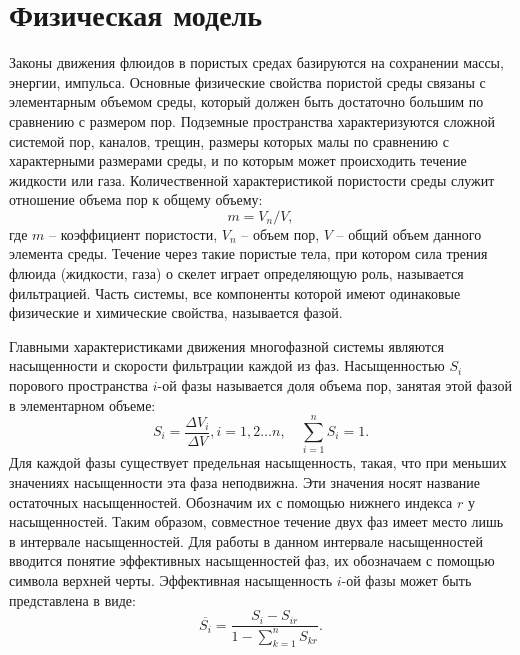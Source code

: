 \section{Физическая модель}

Законы движения флюидов в пористых средах базируются на сохранении
массы, энергии, импульса. Основные
физические свойства пористой среды связаны с элементарным
объемом среды, который должен быть достаточно большим по сравнению с размером
пор. Подземные пространства характеризуются сложной системой пор, каналов,
трещин, размеры которых малы по сравнению с характерными размерами среды, и по
которым может происходить течение жидкости или газа. Количественной
характеристикой пористости среды
служит отношение объема пор к общему объему:
%
	$$m=V_n/V,$$
%	 	
где $m$ -- коэффициент пористости, $V_n$ -- объем пор, $V$ -- общий объем
данного
элемента среды.
%
Течение через такие пористые тела, при котором сила трения флюида
(жидкости, газа) о скелет играет определяющую роль, называется фильтрацией.
Часть системы, все компоненты которой имеют
одинаковые физические и химические свойства, называется фазой. 

Главными характеристиками движения многофазной системы являются насыщенности и
скорости фильтрации каждой из фаз. Насыщенностью $S_i$  порового пространства
$i$-ой фазы называется доля объема пор, занятая этой фазой в элементарном
объеме:
%
\begin{equation} 
S_i=\frac{\Delta V_i}{\Delta V}, i=1,2\ldots n,{\quad}\sum_{i=1}^{n}S_i=1. 
\end{equation}
%
Для каждой фазы существует предельная насыщенность, такая, что при меньших
значениях насыщенности эта фаза неподвижна. Эти значения носят название остаточных 
насыщенностей. Обозначим их с помощью нижнего индекса $r$ у насыщенностей. Таким 
образом, совместное течение двух фаз имеет место лишь в интервале насыщенностей.
Для работы в данном интервале насыщенностей вводится понятие эффективных 
насыщенностей фаз, их обозначаем с помощью символа верхней черты. Эффективная насыщенность 
$i$-ой фазы может быть представлена в виде:
$$\overline{S_i}={\frac{S_i-S_{ir}}{1-\sum\limits_{k=1}^{n}S_{kr}}}.$$

